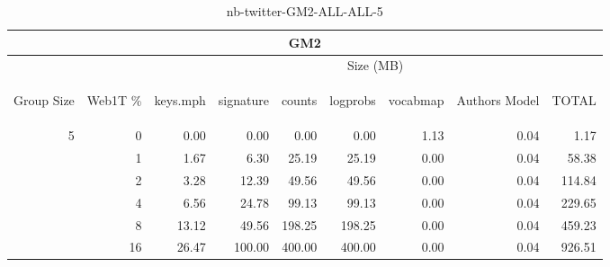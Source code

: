 \begin{center}
\begin{table}[htbp]
\begin{tabular}{ | r | r | r | r | r | r | r | r | r |}
\hline
\multicolumn{9}{|c|}{GM2}\\
\hline
 & & \multicolumn{7}{|c|}{Size (MB)}\\ \cline{3-9}
\begin{sideways}Group Size\end{sideways} & \begin{sideways}Web1T \% \end{sideways} & \begin{sideways}keys.mph\end{sideways} & \begin{sideways}signature\end{sideways} & \begin{sideways}counts\end{sideways} & \begin{sideways}logprobs\end{sideways} & \begin{sideways}vocabmap\end{sideways} & \begin{sideways}Authors Model \end{sideways} & \begin{sideways}TOTAL\end{sideways}\\
\hline
\multirow{5}{*}{5}
 & 0 & 0.00 & 0.00 & 0.00 & 0.00 & 1.13 & 0.04 & 1.17\\ \cline{2-9}
 & 1 & 1.67 & 6.30 & 25.19 & 25.19 & 0.00 & 0.04 & 58.38\\ \cline{2-9}
 & 2 & 3.28 & 12.39 & 49.56 & 49.56 & 0.00 & 0.04 & 114.84\\ \cline{2-9}
 & 4 & 6.56 & 24.78 & 99.13 & 99.13 & 0.00 & 0.04 & 229.65\\ \cline{2-9}
 & 8 & 13.12 & 49.56 & 198.25 & 198.25 & 0.00 & 0.04 & 459.23\\ \cline{2-9}
 & 16 & 26.47 & 100.00 & 400.00 & 400.00 & 0.00 & 0.04 & 926.51\\ \cline{2-9}
\hline
\end{tabular}
\caption{nb-twitter-GM2-ALL-ALL-5}
\label{table:nb-twitter-GM2-ALL-ALL-5}
\end{table}
\end{center}

